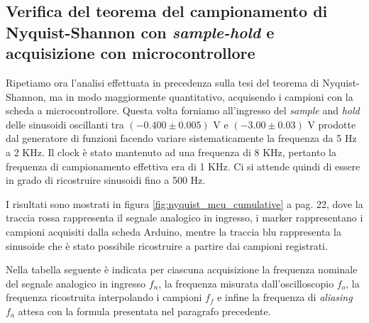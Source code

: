 \documentclass[journal]{IEEEtran}
\begin{document}
\subsection{Verifica del teorema del campionamento di Nyquist-Shannon con \textit{sample-hold} e acquisizione con microcontrollore}

Ripetiamo ora l'analisi effettuata in precedenza sulla tesi del teorema di Nyquist-Shannon, ma in modo maggiormente quantitativo, acquisendo i campioni con la scheda a microcontrollore. Questa volta forniamo all'ingresso del \textit{sample} and \textit{hold} delle sinusoidi oscillanti tra $(-0.400 \pm 0.005)$  V e $(-3.00 \pm 0.03)$ V prodotte dal generatore di funzioni facendo variare sistematicamente la frequenza da 5 Hz a 2 KHz. Il clock è stato mantenuto ad una frequenza di 8 KHz, pertanto la frequenza di campionamento effettiva era di 1 KHz. Ci si attende quindi di essere in grado di ricostruire sinusoidi fino a 500 Hz.

I risultati sono mostrati in figura \ref{fig:nyquist_mcu_cumulative} a pag. 22, dove la traccia rossa rappresenta il segnale analogico in ingresso, i marker rappresentano i campioni acquisiti dalla scheda Arduino, mentre la traccia blu rappresenta la sinusoide che è stato possibile ricostruire a partire dai campioni registrati.

Nella tabella seguente è indicata per ciascuna acquisizione la frequenza nominale del segnale analogico in ingresso $f_n$, la frequenza misurata dall'oscilloscopio $f_o$, la frequenza ricostruita interpolando i campioni $f_f$ e infine la frequenza di \textit{aliasing} $f_a$ attesa con la formula presentata nel paragrafo precedente.

\end{document}
